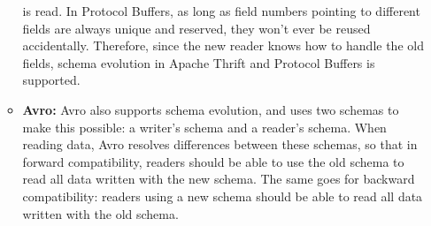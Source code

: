 \begin{enumerate}
\begin{itemize}
                is read. In Protocol Buffers, as long as field numbers pointing 
                to different fields are always unique and reserved, they won't 
                ever be reused accidentally. Therefore, since the new reader 
                knows how to handle the old fields, schema evolution in Apache 
                Thrift and Protocol Buffers is supported.
            \item 
                \textbf{Avro:} Avro also supports schema evolution, and uses 
                two schemas to make this possible: a writer's schema and a 
                reader's schema. When reading data, Avro resolves differences 
                between these schemas, so that in forward compatibility, readers
                should be able to use the old schema to read all data written
                with the new schema. The same goes for backward compatibility:
                readers using a new schema should be able to read all data 
                written with the old schema.
        \end{itemize}
  \end{enumerate}
